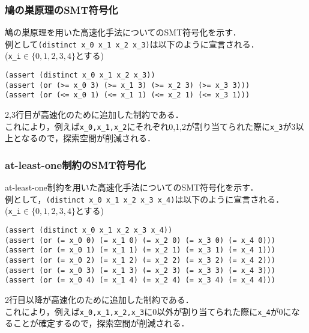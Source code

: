 \documentclass [dvipdfmx,12pt]{beamer}
\begin{document}
\begin{frame}[fragile]\small
    \frametitle{鳩の巣原理のSMT符号化}
    鳩の巣原理を用いた高速化手法についてのSMT符号化を示す．\\
    例として\verb|(distinct x_0 x_1 x_2 x_3)|は以下のように宣言される．\\
    (\verb|x_i|$\in \{0,1,2,3,4\}$とする)
    \begin{exampleblock}{}\scriptsize
\begin{verbatim}
(assert (distinct x_0 x_1 x_2 x_3))
(assert (or (>= x_0 3) (>= x_1 3) (>= x_2 3) (>= x_3 3)))
(assert (or (<= x_0 1) (<= x_1 1) (<= x_2 1) (<= x_3 1)))
\end{verbatim}
    \end{exampleblock}
    2,3行目が高速化のために追加した制約である．\\
    これにより，例えば\verb|x_0,x_1,x_2|にそれぞれ0,1,2が割り当てられた際に\verb|x_3|が3以上となるので，探索空間が削減される．
\end{frame}


\begin{frame}[fragile]\small
    \frametitle{at-least-one制約のSMT符号化}
    at-least-one制約を用いた高速化手法についてのSMT符号化を示す．\\
    例として，\verb|(distinct x_0 x_1 x_2 x_3 x_4)|は以下のように宣言される．\\
    (\verb|x_i|$\in \{0,1,2,3,4\}$とする)
    \begin{exampleblock}{}\scriptsize
\begin{verbatim}
(assert (distinct x_0 x_1 x_2 x_3 x_4))
(assert (or (= x_0 0) (= x_1 0) (= x_2 0) (= x_3 0) (= x_4 0)))
(assert (or (= x_0 1) (= x_1 1) (= x_2 1) (= x_3 1) (= x_4 1)))
(assert (or (= x_0 2) (= x_1 2) (= x_2 2) (= x_3 2) (= x_4 2)))
(assert (or (= x_0 3) (= x_1 3) (= x_2 3) (= x_3 3) (= x_4 3)))
(assert (or (= x_0 4) (= x_1 4) (= x_2 4) (= x_3 4) (= x_4 4)))
\end{verbatim}
    \end{exampleblock}
    2行目以降が高速化のために追加した制約である．\\
    これにより，例えば\verb|x_0,x_1,x_2,x_3|に0以外が割り当てられた際に\verb|x_4|が0になることが確定するので，探索空間が削減される．
\end{frame}
\end{document}

